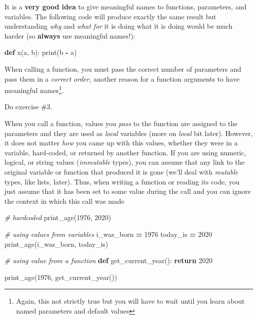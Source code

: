 \documentclass[
]{book}
\newenvironment{Shaded}{\begin{snugshade}}{\end{snugshade}}
\newcommand{\BuiltInTok}[1]{#1}
\newcommand{\CommentTok}[1]{\textcolor[rgb]{0.56,0.35,0.01}{\textit{#1}}}
\newcommand{\ControlFlowTok}[1]{\textcolor[rgb]{0.13,0.29,0.53}{\textbf{#1}}}
\newcommand{\DecValTok}[1]{\textcolor[rgb]{0.00,0.00,0.81}{#1}}
\newcommand{\KeywordTok}[1]{\textcolor[rgb]{0.13,0.29,0.53}{\textbf{#1}}}
\newcommand{\NormalTok}[1]{#1}
\newcommand{\OperatorTok}[1]{\textcolor[rgb]{0.81,0.36,0.00}{\textbf{#1}}}
\begin{document}
It is a \textbf{very good idea} to give meaningful names to functions, parameters, and variables. The following code will produce exactly the same result but understanding \emph{why} and \emph{what for} it is doing what it is doing would be much harder (so \textbf{always} use meaningful names!):

\begin{Shaded}
\begin{Highlighting}[]
\KeywordTok{def}\NormalTok{ x(a, b):}
    \BuiltInTok{print}\NormalTok{(b }\OperatorTok{{-}}\NormalTok{ a)}
\end{Highlighting}
\end{Shaded}

When calling a function, you must pass the correct number of parameters and pass them in a \emph{correct order}, another reason for a function arguments to have meaningful names\footnote{Again, this not strictly true but you will have to wait until you learn about named parameters and default values}.

Do exercise \#3.

When you call a function, values you \emph{pass} to the function are assigned to the parameters and they are used as \emph{local} variables (more on \emph{local} bit later). However, it does not matter \emph{how} you came up with this values, whether they were in a variable, hard-coded, or returned by another function. If you are using numeric, logical, or string values (\emph{immutable} types), you can assume that any link to the original variable or function that produced it is gone (we'll deal with \emph{mutable} types, like lists, later). Thus, when writing a function or reading its code, you just assume that it has been set to some value during the call and you can ignore the context in which this call was made

\begin{Shaded}
\begin{Highlighting}[]
\CommentTok{\# hardcoded}
\NormalTok{print\_age(}\DecValTok{1976}\NormalTok{, }\DecValTok{2020}\NormalTok{)}

\CommentTok{\# using values from variables}
\NormalTok{i\_was\_born }\OperatorTok{=} \DecValTok{1976}
\NormalTok{today\_is }\OperatorTok{=} \DecValTok{2020}
\NormalTok{print\_age(i\_was\_born, today\_is)}

\CommentTok{\# using value from a function}
\KeywordTok{def}\NormalTok{ get\_current\_year():}
    \ControlFlowTok{return} \DecValTok{2020}

\NormalTok{print\_age(}\DecValTok{1976}\NormalTok{, get\_current\_year())}
\end{Highlighting}
\end{Shaded}
\end{document}
